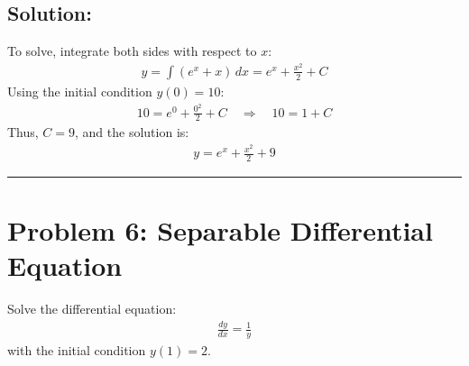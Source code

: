 \documentclass[letterpaper,10pt,english]{jupyterBook}
\begin{document}
\subsection{Solution:}
\label{\detokenize{prerequisites:id6}}
\sphinxAtStartPar
To solve, integrate both sides with respect to \(x\):
\begin{equation*}
\begin{split}
y = \int (e^x + x) \, dx = e^x + \frac{x^2}{2} + C
\end{split}
\end{equation*}
\sphinxAtStartPar
Using the initial condition \(y(0) = 10\):
\begin{equation*}
\begin{split}
10 = e^0 + \frac{0^2}{2} + C \quad \Rightarrow \quad 10 = 1 + C
\end{split}
\end{equation*}
\sphinxAtStartPar
Thus, \(C = 9\), and the solution is:
\begin{equation*}
\begin{split}
y = e^x + \frac{x^2}{2} + 9
\end{split}
\end{equation*}

\bigskip\hrule\bigskip



\section{Problem 6: Separable Differential Equation}
\label{\detokenize{prerequisites:problem-6-separable-differential-equation}}
\sphinxAtStartPar
Solve the differential equation:
\begin{equation*}
\begin{split}
\frac{dy}{dx} = \frac{1}{y}
\end{split}
\end{equation*}
\sphinxAtStartPar
with the initial condition \(y(1) = 2\).
\end{document}
